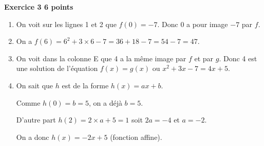 \textbf{Exercice 3 \hfill 6 points}

\medskip
 
%
%

\begin{enumerate}
\item %
On voit sur les lignes 1 et 2 que $f(0) = - 7$. Donc $0$ a pour image $- 7$ par $f$. 
\item %
On a $f(6) = 6^2 + 3 \times 6 - 7 = 36 + 18 - 7 = 54 - 7 = 47$. 
\item %
On voit dans la colonne E que 4 a la même image par $f$ et par $g$. Donc 4 est une solution de l'équation $f(x) = g(x)$ ou  $x^2+ 3x - 7 =  4x + 5$.
\item %
On sait que $h$ est de la forme $h(x) = ax + b$.

Comme $h(0) = b = 5$, on a déjà $b = 5$.

D'autre part $h(2) = 2 \times a + 5 = 1$ soit $2a = - 4$ et $a = - 2$.

On a donc $h(x) = -2x + 5$ (fonction affine).
\end{enumerate}

\bigskip

